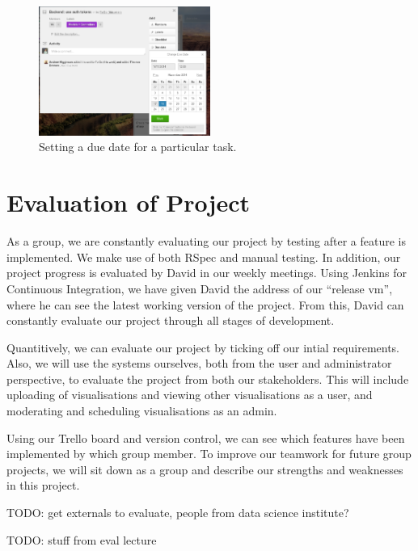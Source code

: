 \documentclass[a4paper]{article}
\begin{document}
\begin{figure}[h!]
  \centering
    \includegraphics[width = 0.5\textwidth]{./evaluation/trello-due-date.png}

  \caption{Setting a due date for a particular task.}
  \label{fig:deadline}
\end{figure}



\section{Evaluation of Project}
As a group, we are constantly evaluating our project by testing after a 
feature is implemented. We make use of both RSpec and manual testing. In 
addition, our project progress is evaluated by David in our weekly 
meetings. Using Jenkins for Continuous Integration, we have given David
the address of our ``release vm'', where he can see the latest working 
version of the project. From this, David can constantly evaluate our project 
through all stages of development.

Quantitively, we can evaluate our project by ticking off our intial 
requirements. Also, we will use the systems ourselves, both from the user 
and administrator perspective, to evaluate the project from both our stakeholders.
This will include uploading of visualisations and viewing other visualisations as a
user, and moderating and scheduling visualisations as an admin.

Using our Trello board and version control, we can see which features have been 
implemented by which group member. To improve our teamwork for future group 
projects, we will sit down as a group and describe our strengths and weaknesses in 
this project.

TODO: get externals to evaluate, people from data science institute? 

TODO: stuff from eval lecture
\end{document}
